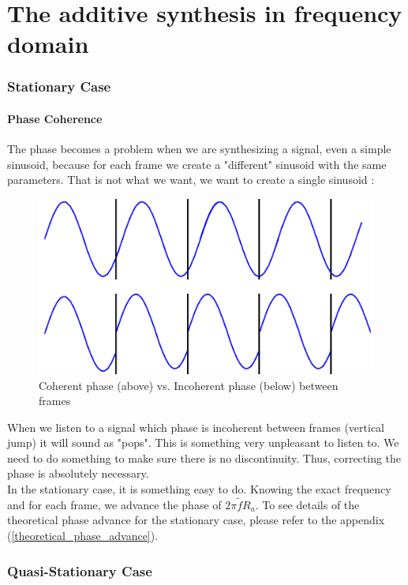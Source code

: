 \documentclass[]{article}
\begin{document}
\newpage
\part{The additive synthesis in frequency domain}

\section{Stationary Case}\label{stationary-case}
\subsection{Phase Coherence}\label{stationary-case}
The phase becomes a problem when we are synthesizing a signal, even a simple sinusoid, because for each frame we create a "different" sinusoid with the same parameters. That is not what we want, we want to create a single sinusoid : 
	\begin{figure} [H]
	\centering
	\includegraphics[scale = 0.2]{coherentphase.png}
	\caption {Coherent phase (above) vs. Incoherent phase (below) between frames}
	\end{figure}
 When we listen to a signal which phase is incoherent between frames (vertical jump) it will sound as "pops".  This is something very unpleasant to listen to. We need to do something to make sure there is no discontinuity. Thus, correcting the phase is absolutely necessary. \\
In the stationary case, it is something easy to do. Knowing the exact frequency and for each frame, we advance the phase of $2\pi \tilde{f} R_a$. To see details of the theoretical phase advance for the stationary case, please refer to the appendix (\ref{theoretical_phase_advance}).
\section{Quasi-Stationary Case}\label{quasi-stationary-case}
\end{document}
